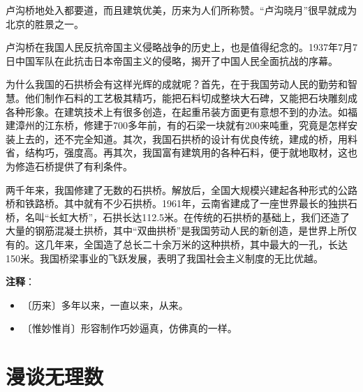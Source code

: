 \documentclass[12pt,UTF-8,openany]{ctexbook}
\begin{document}
\begin{large}
    卢沟桥地处入都要道，而且建筑优美，历来为人们所称赞。“卢沟晓月”很早就成为北京的胜景之一。
    
    卢沟桥在我国人民反抗帝国主义侵略战争的历史上，也是值得纪念的。1937年7月7日中国军队在此抗击日本帝国主义的侵略，揭开了中国人民全面抗战的序幕。
    
    为什么我国的石拱桥会有这样光辉的成就呢？首先，在于我国劳动人民的勤劳和智慧。他们制作石料的工艺极其精巧，能把石料切成整块大石碑，又能把石块雕刻成各种形象。在建筑技术上有很多创造，在起重吊装方面更有意想不到的办法。如福建漳州的江东桥，修建于700多年前，有的石梁一块就有200来吨重，究竟是怎样安装上去的，还不完全知道。其次，我国石拱桥的设计有优良传统，建成的桥，用料省，结构巧，强度高。再其次，我国富有建筑用的各种石料，便于就地取材，这也为修造石桥提供了有利条件。
    
    两千年来，我国修建了无数的石拱桥。解放后，全国大规模兴建起各种形式的公路桥和铁路桥。其中就有不少石拱桥。1961年，云南省建成了一座世界最长的独拱石桥，名叫“长虹大桥”，石拱长达112.5米。在传统的石拱桥的基础上，我们还造了大量的钢筋混凝土拱桥，其中“双曲拱桥”是我国劳动人民的新创造，是世界上所仅有的。这几年来，全国造了总长二十余万米的这种拱桥，其中最大的一孔，长达150米。我国桥梁事业的飞跃发展，表明了我国社会主义制度的无比优越。
    
\end{large}


\newpage

\textbf{注释}：

\vspace{-1em}

\begin{itemize}
    \setlength\itemsep{-0.2em}
    \item 〔历来〕多年以来，一直以来，从来。
    \item 〔惟妙惟肖〕形容制作巧妙逼真，仿佛真的一样。
\end{itemize}

\chapter{漫谈无理数}
\end{document}
